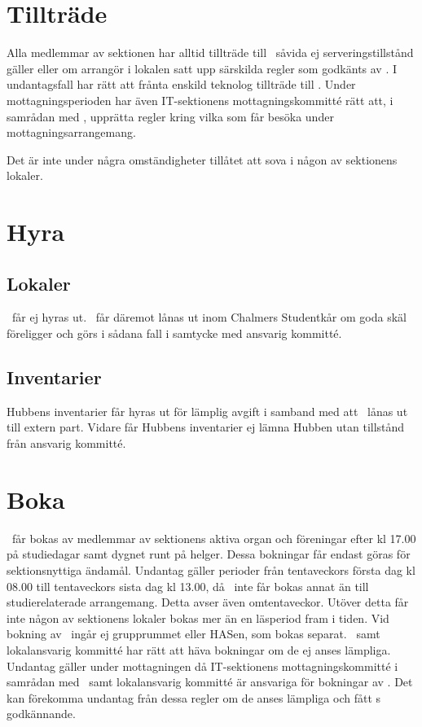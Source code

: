 \documentclass[11pt, includeaddress]{classes/cthit}
\begin{document}
\section{Tillträde}
Alla medlemmar av sektionen har alltid tillträde till \HUBBEN\ såvida ej serveringstillstånd gäller eller
om arrangör i lokalen satt upp särskilda regler som godkänts av \STYRIT. I undantagsfall har \STYRIT{} rätt
att frånta enskild teknolog tillträde till \HUBBEN{}. Under mottagningsperioden har även IT-sektionens mottagningskommitté rätt att, i samrådan med \STYRIT{}, upprätta regler kring vilka som får besöka \HUBBEN{} under mottagningsarrangemang.

Det är inte under några omständigheter tillåtet att sova i någon av sektionens lokaler.


\section{Hyra}
\subsection{Lokaler}
\HUBBEN\ får ej hyras ut. \HUBBEN\ får däremot lånas ut inom Chalmers Studentkår om goda skäl
föreligger och görs i sådana fall i samtycke med ansvarig kommitté.

\subsection{Inventarier}
Hubbens inventarier får hyras ut för lämplig avgift i samband med att \HUBBEN\ lånas ut till extern part.
Vidare får Hubbens inventarier ej lämna Hubben utan tillstånd från ansvarig kommitté.


\section{Boka}
\HUBBEN\ får bokas av medlemmar av sektionens aktiva organ och föreningar efter kl 17.00 på
studiedagar samt dygnet runt på helger. Dessa bokningar får endast göras för sektionsnyttiga ändamål.
Undantag gäller perioder från tentaveckors första dag kl 08.00 till tentaveckors sista dag kl 13.00, då
\HUBBEN\ inte får bokas annat än till studierelaterade arrangemang. Detta avser även omtentaveckor.
Utöver detta får inte någon av sektionens lokaler bokas mer än en läsperiod fram i tiden.
Vid bokning av \HUBBEN\ ingår ej grupprummet eller HASen, som bokas separat. \STYRIT\ samt
lokalansvarig kommitté har rätt att häva bokningar om de ej anses lämpliga. Undantag gäller under mottagningen då IT-sektionens mottagningskommitté i samrådan med \STYRIT\ samt lokalansvarig kommitté är ansvariga för bokningar av \HUBBEN.
Det kan förekomma undantag från dessa regler om de anses lämpliga och fått \STYRIT{}s godkännande.
\end{document}
